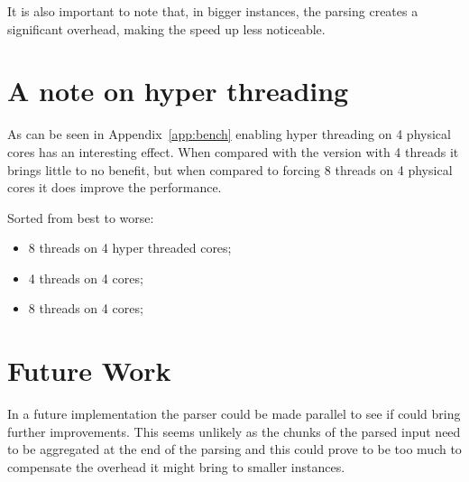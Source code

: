 \documentclass[a4paper]{article}
\begin{document}
It is also important to note that, in bigger instances, the parsing creates a
significant overhead, making the speed up less noticeable.

\section{A note on hyper threading}

As can be seen in Appendix~\ref{app:bench} enabling hyper threading on 4 physical
cores has an interesting effect. When compared with the version with 4 threads
it brings little to no benefit, but when compared to forcing 8 threads on 4
physical cores it does improve the performance.

Sorted from best to worse:

\begin{itemize}
    \item 8 threads on 4 hyper threaded cores;
    \item 4 threads on 4 cores;
    \item 8 threads on 4 cores;
\end{itemize}


\section{Future Work}
In a future implementation the parser could be made parallel to see if could
bring further improvements. This seems unlikely as the chunks of the parsed
input need to be aggregated at the end of the parsing and this could prove to be
too much to compensate the overhead it might bring to smaller instances.
\end{document}
